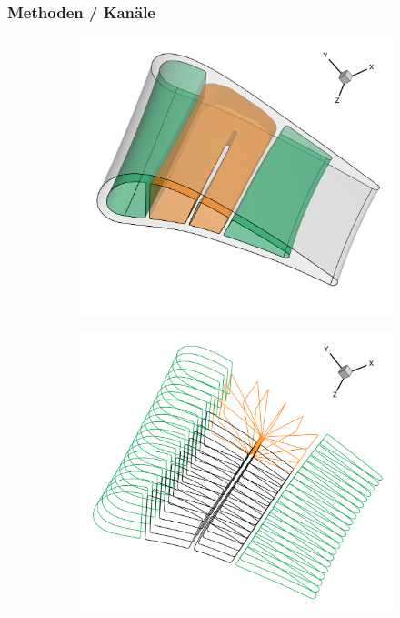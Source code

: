 \documentclass[8pt, aspectratio=169]{beamer}
\begin{document}
\begin{frame}
	\frametitle{Methoden / Kanäle}
	\vspace{-1cm}\hspace{2.5cm}
	\begin{figure}
		\centering
		\begin{subfigure}{.49\textwidth}
			\phantom{aaaaaaa}
			\includegraphics[height=.8\textheight]{../tec/channel/14.png}
		\end{subfigure}
		\begin{subfigure}{.49\textwidth}
			\includegraphics[height=.8\textheight]{../tec/channel/13.png}
		\end{subfigure}
	\end{figure}
\end{frame}
\end{document}
